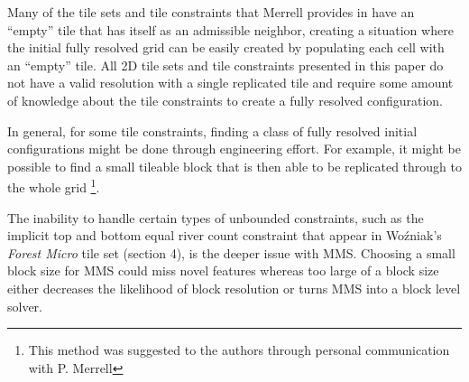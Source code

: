 Many of the tile sets and tile constraints that Merrell provides in \cite{Merrell_2007, Merrell_2009} have an ``empty'' tile that 
has itself as an admissible neighbor, creating a situation where the initial fully resolved grid can be easily created
by populating each cell with an ``empty'' tile.
All 2D tile sets and tile constraints presented in this paper do not have a valid resolution with a single replicated
tile and require some amount of knowledge about the tile constraints
to create a fully resolved configuration.

In general, for some tile constraints, finding a class of fully resolved initial configurations might be done through engineering effort.
For example, it might be possible to find a small tileable block that is then able to be replicated through to the whole grid
\footnote{ This method was suggested to the authors through personal communication with P. Merrell }.

The inability to handle certain types of unbounded constraints, such as the implicit top and bottom equal river count constraint that appear in
Wo\'zniak's \textit{Forest Micro} tile set (section 4), is the deeper issue with MMS.
Choosing a small block size for MMS could miss novel features whereas too large of a block size either decreases
the likelihood of block resolution or turns MMS into a block level solver.





